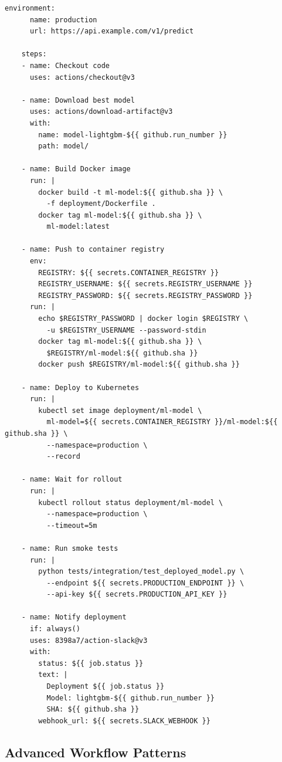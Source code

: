 \begin{lstlisting}[style=yaml, caption=Complete ML CI/CD Workflow]
    environment:
      name: production
      url: https://api.example.com/v1/predict

    steps:
    - name: Checkout code
      uses: actions/checkout@v3

    - name: Download best model
      uses: actions/download-artifact@v3
      with:
        name: model-lightgbm-${{ github.run_number }}
        path: model/

    - name: Build Docker image
      run: |
        docker build -t ml-model:${{ github.sha }} \
          -f deployment/Dockerfile .
        docker tag ml-model:${{ github.sha }} \
          ml-model:latest

    - name: Push to container registry
      env:
        REGISTRY: ${{ secrets.CONTAINER_REGISTRY }}
        REGISTRY_USERNAME: ${{ secrets.REGISTRY_USERNAME }}
        REGISTRY_PASSWORD: ${{ secrets.REGISTRY_PASSWORD }}
      run: |
        echo $REGISTRY_PASSWORD | docker login $REGISTRY \
          -u $REGISTRY_USERNAME --password-stdin
        docker tag ml-model:${{ github.sha }} \
          $REGISTRY/ml-model:${{ github.sha }}
        docker push $REGISTRY/ml-model:${{ github.sha }}

    - name: Deploy to Kubernetes
      run: |
        kubectl set image deployment/ml-model \
          ml-model=${{ secrets.CONTAINER_REGISTRY }}/ml-model:${{ github.sha }} \
          --namespace=production \
          --record

    - name: Wait for rollout
      run: |
        kubectl rollout status deployment/ml-model \
          --namespace=production \
          --timeout=5m

    - name: Run smoke tests
      run: |
        python tests/integration/test_deployed_model.py \
          --endpoint ${{ secrets.PRODUCTION_ENDPOINT }} \
          --api-key ${{ secrets.PRODUCTION_API_KEY }}

    - name: Notify deployment
      if: always()
      uses: 8398a7/action-slack@v3
      with:
        status: ${{ job.status }}
        text: |
          Deployment ${{ job.status }}
          Model: lightgbm-${{ github.run_number }}
          SHA: ${{ github.sha }}
        webhook_url: ${{ secrets.SLACK_WEBHOOK }}
\end{lstlisting}

\subsection{Advanced Workflow Patterns}

